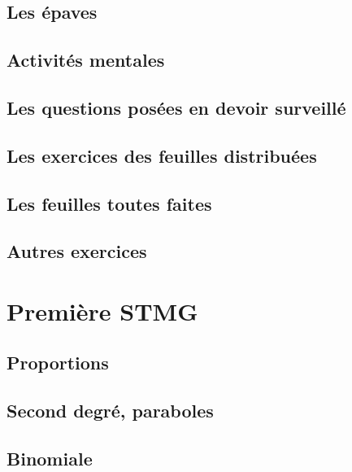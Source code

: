 \documentclass[a4paper,12pt]{book}
\begin{document}
\chapter{Les épaves}


\chapter{Activités mentales}


\chapter{Les questions posées en devoir surveillé}


\chapter{Les exercices des feuilles distribuées}


\chapter{Les feuilles toutes faites}


\chapter{Autres exercices}


\part{Première STMG}
\chapter{Proportions}


\chapter{Second degré, paraboles}


\chapter{Binomiale}

\end{document}
